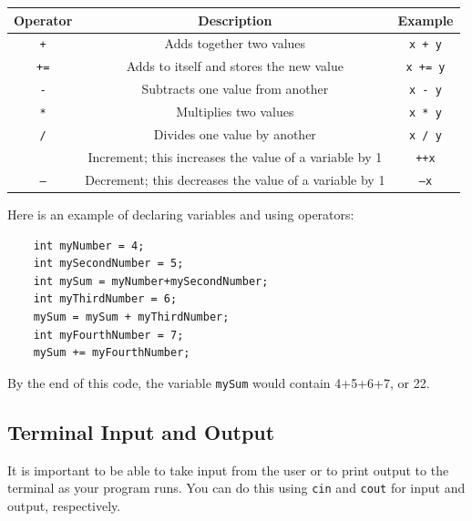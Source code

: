 \begin{table}[H]
    \centering
    \begin{tabular}{c|c|c}\hline
        Operator & Description & Example \\ \hline
        \texttt{+}	& Adds together two values & \texttt{x + y}\\
        \texttt{+=} & Adds to itself and stores the new value& \texttt{x += y}\\
        \texttt{-} & Subtracts one value from another & \texttt{x - y} \\
        \texttt{*} &	Multiplies two values & \texttt{x * y} \\
        \texttt{/} & Divides one value by another & \texttt{x / y} \\
        \texttt{%
        \texttt{++} & Increment; this increases the value of a variable by 1 & \texttt{++x} \\
        \texttt{--} & Decrement; this decreases the value of a variable by 1 & \texttt{--x}
    \end{tabular}
\end{table}

\begin{example}
Here is an example of declaring variables and using operators:
\begin{verbatim}
    int myNumber = 4;
    int mySecondNumber = 5;
    int mySum = myNumber+mySecondNumber;
    int myThirdNumber = 6;
    mySum = mySum + myThirdNumber;
    int myFourthNumber = 7;
    mySum += myFourthNumber;
\end{verbatim}

By the end of this code, the variable \texttt{mySum} would contain 4+5+6+7, or 22. 
\end{example}

\subsection{Terminal Input and Output}

It is important to be able to take input from the user or to print output to the terminal as your program runs. You can do this using \texttt{cin} and \texttt{cout} for input and output, respectively. 

